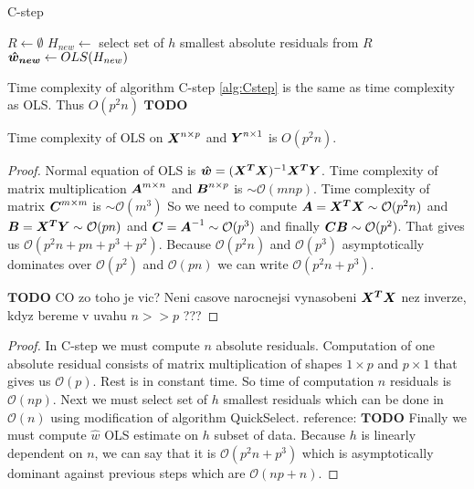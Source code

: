\begin{algorithm}[H]
	\label{alg:Cstep}
	\caption{C-step}
	
	$R \gets \emptyset$\;
	$H_{new} \gets $ select set of $h$ smallest absolute residuals from $R$\;
	$\boldsymbol{\hat{w}_{new}} \gets OLS(H_{new})$\;
	\;
\end{algorithm}

\begin{observation} 
	Time complexity of algorithm C-step \ref{alg:Cstep} is the same as time complexity as OLS. Thus $O(p^2n)$
	$\boldsymbol{{TODO}}$
\end{observation} 

\begin{lemma}
	Time complexity of OLS  on $\m{X}^{n \times p}$ and $\m{Y}^{n \times 1}$ is $O(p^2n)$.
\end{lemma}

\begin{proof}
	Normal equation of OLS is $\vec{\hat{w}} = (\m{X^T}\m{X})^{-1}\m{X^T}\m{Y}$.
	Time complexity  of matrix multiplication $\m{A}^{m \times n}$ and  $\m{B}^{n \times p}$ is $\sim \mathcal{O}(mnp)$.
	Time complexity of matrix $\m{C}^{m \times m}$ is $\sim \mathcal{O}(m^3)$
	So we need to compute 
	$\m{A} = \m{X^T}\m{X} \sim \mathcal{O}(p^2n)$ and
	$\m{B} = \m{X^T}\m{Y} \sim \mathcal{O}(pn)$ and
	$\m{C} = \m{A}^{-1} \sim \mathcal{O}(p^3)$ and finally 
	$\m{C}\m{B} \sim \mathcal{O}(p^2)$. 
	That gives us $\mathcal{O}(p^2n + pn + p^3 + p^2)$. Because  $\mathcal{O}(p^2n)$ and 
	$\mathcal{O}(p^3)$ asymptotically dominates over $\mathcal{O}(p^2)$ and $\mathcal{O}(pn)$ we can
	write $\mathcal{O}(p^2n + p^3)$.

	$\boldsymbol{{TODO}}$ CO zo toho je vic? Neni casove narocnejsi vynasobeni $\m{X^T}\m{X}$ nez inverze, kdyz bereme v uvahu $n >> p$ ???
\end{proof}

\begin{proof}
	In C-step we must compute $n$ absolute residuals. Computation of one absolute residual consists of
	matrix multiplication of shapes $1 \times p$ and $p \times 1$ that gives us $\mathcal{O}(p)$. Rest is in constant time.
	So time of computation $n$ residuals is $\mathcal{O}(np)$.
	Next we must select set of $h$ smallest residuals which can be done in $\mathcal{O}(n)$ using modification 
	of algorithm QuickSelect. reference: $\boldsymbol{{TODO}}$
	Finally we must compute $\hat{w}$ OLS estimate on $h$ subset of data.
	Because $h$ is linearly dependent on $n$, we can say that it is $\mathcal{O}(p^2n + p^3)$ which 
	is asymptotically dominant against previous steps which are $\mathcal{O}(np + n)$.
\end{proof}

